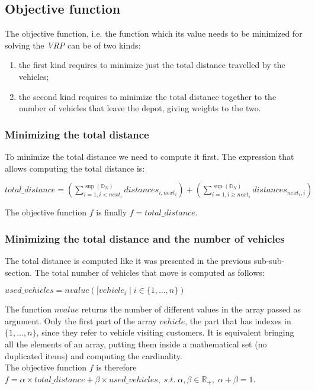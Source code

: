 \documentclass[../main.tex]{subfiles}
\begin{document}
\subsection{Objective function}
The objective function, i.e. the function which its value needs to be minimized for solving the \textit{VRP} can be of two kinds:
\begin{enumerate}
    \item the first kind requires to minimize just the total distance travelled by the vehicles;
    \item the second kind requires to minimize the total distance together to the number of vehicles that leave the depot, giving weights to the two.
\end{enumerate}
\subsubsection{Minimizing the total distance}
To minimize the total distance we need to compute it first. The expression that allows computing the total distance is:
\begin{center} %
    \begin{math}
        total\_distance = (\sum_{i = 1, i < next_i}^{\sup{}(\mathbb{D}_N)}{distances_{i, next_i}}) + (\sum_{i = 1, i \geq next_i}^{\sup{}(\mathbb{D}_N)}{distances_{next_i, i}})
    \end{math}
\end{center}
The objective function $f$ is finally $f = total\_distance$.

\subsubsection{Minimizing the total distance and the number of vehicles}
The total distance is computed like it was presented in the previous sub-sub-section. The total number of vehicles that move is computed as follows:
\begin{center} %
    \begin{math}
        used\_vehicles = nvalue([vehicle_i \; | \; i \in \{1,\dots,n\})
    \end{math}
\end{center}
The function $nvalue$ returns the number of different values in the array passed as argument.
Only the first part of the array $vehicle$, the part that has indexes in $\{1,\dots,n\}$, since they refer to vehicle visiting customers.
It is equivalent bringing all the elements of an array, putting them inside a mathematical set (no duplicated items) and computing the cardinality.\\
The objective function $f$ is therefore $f = \alpha{}\times{}total\_distance + \beta{}\times{}used\_vehicles, \; s.t. \; \alpha{}, \beta{} \in \mathbb{R}_+, \; \alpha{} + \beta{} = 1$.
\end{document}
